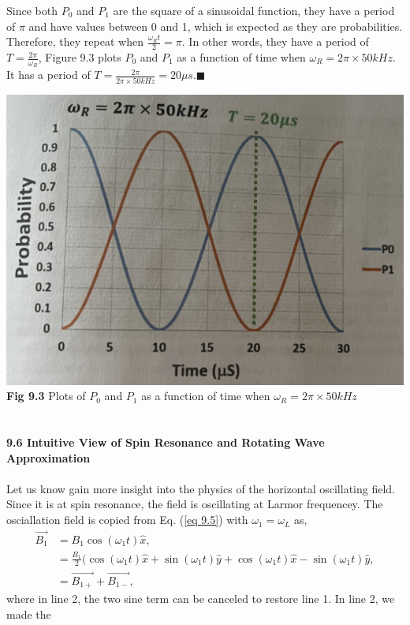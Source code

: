 \documentclass{article}
\begin{document}
Since both $P_0$ and $P_1$ are the square of a sinusoidal function, they have a period of $\pi$ and have
values between 0 and 1, which is expected as they are probabilities. Therefore, they repeat
when $\frac{\omega_Rt}{2}=\pi$. In other words, they have a period of $T=\frac{2\pi}{\omega_R}$,
Figure 9.3 plots $P_0$ and $P_1$ as a function of time when $\omega_R=2\pi\times50kHz$. It has a period of 
$T=\frac{2\pi}{2\pi\times50kHz}=20\mu s$.\hfill $\blacksquare$


\includegraphics[scale=0.45]{Fig.9.3.jpeg}\\
\textbf{Fig 9.3} Plots of $P_0$ and $P_1$ as a function of time when $\omega_R=2\pi\times50kHz$\\\\\\
\textbf{\large 9.6 Intuitive View of Spin Resonance and Rotating Wave Approximation}\\\\
Let us know gain more insight into the physics of the horizontal oscillating field. Since it is at spin
resonance, the field is oscillating at Larmor frequencey. The osciallation field is copied from Eq. (\ref{eq 9.5}) with
$\omega_1=\omega_L$ as,
\begin{align*}\label{eq 9.36}
    \vec{B_1}&=B_1\cos(\omega_1t)\hat{x},\\
    &=\frac{B_1}{2}(\cos(\omega_1t)\hat{x}+\sin(\omega_1t)\hat{y}+\cos(\omega_1t)\hat{x}-\sin(\omega_1t)\hat{y},\\
    &=\vec{B_{1+}}+\vec{B_{1-}}, \tag{9.36}
\end{align*}
where in line 2, the two sine term can be canceled to restore line 1. In line 2, we made the 
\end{document}
